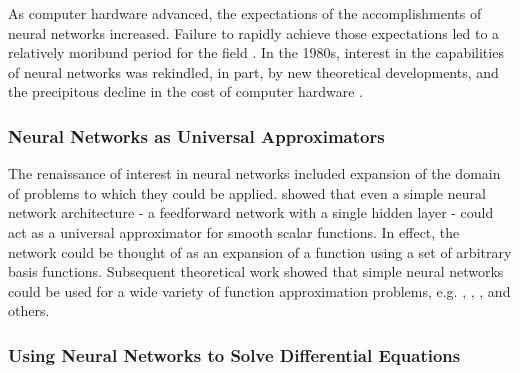 \documentclass{article}
\begin{document}
As computer hardware advanced, the expectations of the accomplishments of neural networks increased. Failure to rapidly achieve those expectations led to a relatively moribund period for the field \cite{Minsky1969}. In the 1980s, interest in the capabilities of neural networks was rekindled, in part, by new theoretical developments, and the precipitous decline in the cost of computer hardware \cite{Allman1990}.

\subsubsection{Neural Networks as Universal Approximators}

The renaissance of interest in neural networks included expansion of the domain of problems to which they could be applied. \cite{Hornik1989} showed that even a simple neural network architecture - a feedforward network with a single hidden layer - could act as a universal approximator for smooth scalar functions. In effect, the network could be thought of as an expansion of a function using a set of arbitrary basis functions. Subsequent theoretical work showed that simple neural networks could be used for a wide variety of function approximation problems, e.g. \cite{Blum1991}, \cite{Cardaliaguet1992}, \cite{Webb1994}, and others.

\subsubsection{Using Neural Networks to Solve Differential Equations}
\end{document}
